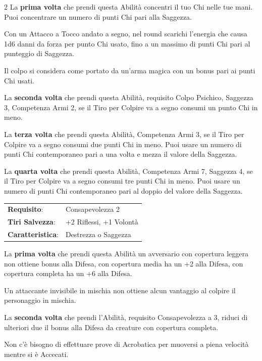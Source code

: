\begin{multicols}{2}
La \textbf{prima volta} che prendi questa Abilità concentri il tuo Chi nelle tue mani. Puoi concentrare un numero di punti Chi pari alla Saggezza.

Con un Attacco a Tocco andato a segno, nel round scarichi l'energia che causa 1d6 danni da forza per punto Chi usato, fino a un massimo di punti Chi pari al punteggio di Saggezza.

Il colpo si considera come portato da un'arma magica con un bonus pari ai punti Chi usati.

La \textbf{seconda volta} che prendi questa Abilità, requisito Colpo Psichico, Saggezza 3, Competenza Armi 2, se il Tiro per Colpire va a segno consumi un punto Chi in meno.

La \textbf{terza volta} che prendi questa Abilità, Competenza Armi 3, se il Tiro per Colpire va a segno consumi due punti Chi in meno. Puoi usare un numero di punti Chi contemporaneo pari a una volta e mezza il valore della Saggezza.

La \textbf{quarta volta} che prendi questa Abilità, Competenza Armi 7, Saggezza 4, se il Tiro per Colpire va a segno consumi tre punti Chi in meno. Puoi usare un numero di punti Chi contemporaneo pari al doppio del valore della Saggezza.

\hspace{-0.2cm}\begin{tabularx}{\linewidth}{l@{\hspace{8pt}}X}
\rowcolor{gray!20}\textbf{Requisito}: & Consapevolezza 2\\
\textbf{Tiri Salvezza}: & +2 Riflessi, +1 Volontà\\
\rowcolor{gray!20}\textbf{Caratteristica}: & Destrezza o Saggezza\\
\end{tabularx}\smallskip

La \textbf{prima volta} che prendi questa Abilità un avversario con copertura leggera non ottiene bonus alla Difesa, con copertura media ha un +2 alla Difesa, con copertura completa ha un +6 alla Difesa.

Un attaccante invisibile in mischia non ottiene alcun vantaggio al colpire il personaggio in mischia.

La \textbf{seconda volta} che prendi l'Abilità, requisito Consapevolezza a 3, riduci di ulteriori due il bonus alla Difesa da creature con copertura completa.

Non c'è bisogno di effettuare prove di Acrobatica per muoversi a piena velocità mentre si è Accecati.


\end{multicols}

